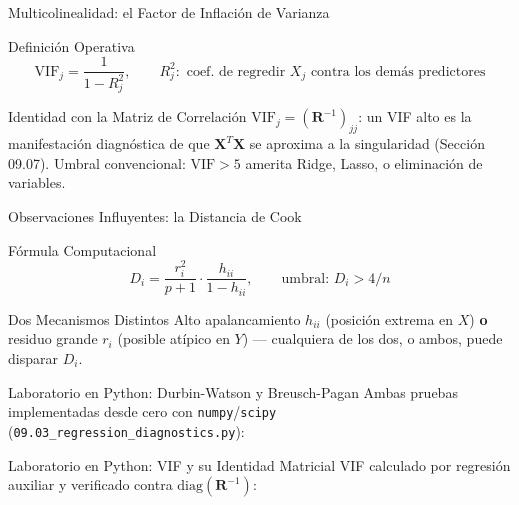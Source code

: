 \documentclass[10pt, aspectratio=169]{beamer}
\begin{document}
\begin{frame}{Multicolinealidad: el Factor de Inflación de Varianza}
  \footnotesize
  \begin{block}{Definición Operativa}
    $$\text{VIF}_j=\frac{1}{1-R_j^2}, \qquad R_j^2: \text{ coef. de regredir } X_j \text{ contra los demás predictores}$$
  \end{block}
  \pause

  \vspace{0.1cm}
  \begin{alertblock}{Identidad con la Matriz de Correlación}
    $\text{VIF}_j=(\mathbf{R}^{-1})_{jj}$: un VIF alto es la manifestación diagnóstica de que $\mathbf{X}^T\mathbf{X}$ se aproxima a la singularidad (Sección 09.07). Umbral convencional: $\text{VIF}>5$ amerita Ridge, Lasso, o eliminación de variables.
  \end{alertblock}
\end{frame}

\begin{frame}{Observaciones Influyentes: la Distancia de Cook}
  \footnotesize
  \begin{block}{Fórmula Computacional}
    $$D_i=\frac{r_i^2}{p+1}\cdot\frac{h_{ii}}{1-h_{ii}}, \qquad \text{umbral: } D_i>4/n$$
  \end{block}
  \pause

  \vspace{0.1cm}
  \begin{alertblock}{Dos Mecanismos Distintos}
    Alto apalancamiento $h_{ii}$ (posición extrema en $X$) \textbf{o} residuo grande $r_i$ (posible atípico en $Y$) --- cualquiera de los dos, o ambos, puede disparar $D_i$.
  \end{alertblock}
\end{frame}

\begin{frame}[fragile]{Laboratorio en Python: Durbin-Watson y Breusch-Pagan}
  \scriptsize
  Ambas pruebas implementadas desde cero con \texttt{numpy}/\texttt{scipy} (\texttt{09.03\_regression\_diagnostics.py}):
  {
  }
\end{frame}

\begin{frame}[fragile]{Laboratorio en Python: VIF y su Identidad Matricial}
  \scriptsize
  VIF calculado por regresión auxiliar y verificado contra $\text{diag}(\mathbf{R}^{-1})$:
  {
  }
\end{frame}
\end{document}

